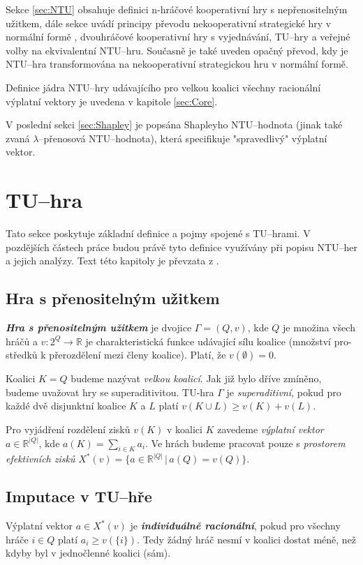     Sekce \ref{sec:NTU} obsahuje definici n-hráčové kooperativní hry s nepřenositelným užitkem, dále sekce uvádí principy převodu nekooperativní strategické hry v normální formě \cite{Hruby2022NCOOP}, dvouhráčové kooperativní hry s vyjednávání, TU--hry a veřejné volby na ekvivalentní NTU--hru. Současně je také uveden opačný převod, kdy je NTU--hra transformována na nekooperativní strategickou hru v normální formě.

    Definice jádra NTU--hry udávajícího pro velkou koalici všechny racionální výplatní vektory je uvedena v kapitole \ref{sec:Core}.

    V poslední sekci \ref{sec:Shapley} je popsána Shapleyho NTU--hodnota (jinak také zvaná $\lambda$--přenosová NTU--hodnota), která specifikuje "spravedlivý" výplatní vektor.


\section{TU--hra}
    \label{sec:TU}
    Tato sekce poskytuje základní definice a pojmy spojené s TU--hrami. V pozdějších částech práce budou právě tyto definice využívány při popisu NTU--her a jejich analýzy. Text této kapitoly je převzata z \cite{Hruby2022}.

    \subsection{Hra s přenositelným užitkem}
        \textit{\textbf{Hra s přenositelným užitkem}} je dvojice $\Gamma = (Q, v)$, kde $Q$ je množina všech hráčů a $v: 2^Q \rightarrow \mathbb{R}$ je charakteristická funkce udávající sílu koalice (množství pro-středků k přerozdělení mezi členy koalice). Platí, že $v(\emptyset) = 0$.

        Koalici $K = Q$ budeme nazývat \textit{velkou koalicí}. Jak již bylo dříve zmíněno, budeme uvažovat hry se superaditivitou. TU-hra $\Gamma$ je \textit{superaditivní}, pokud pro každé dvě disjunktní koalice $K$ a $L$ platí $v(K \cup L) \geq v(K) + v(L)$.

        Pro vyjádření rozdělení zisků $v(K)$ v koalici $K$ zavedeme \textit{výplatní vektor} $a \in \mathbb{R}^{|Q|}$, kde $a(K) = \sum_{i\in K}a_i$. Ve hrách budeme pracovat pouze s \textit{prostorem efektivních zisků} $X^*(v) = \{a \in \mathbb{R}^{|Q|}\,|\,a(Q) = v(Q)\}$.

    \subsection{Imputace v TU--hře}
        Výplatní vektor $a \in X^*(v)$ je \textit{\textbf{individuálně racionální}}, pokud pro všechny hráče $i \in Q$ platí $a_i \geq v(\{i\})$. Tedy žádný hráč nesmí v koalici dostat méně, než kdyby byl v jednočlenné koalici (sám).

